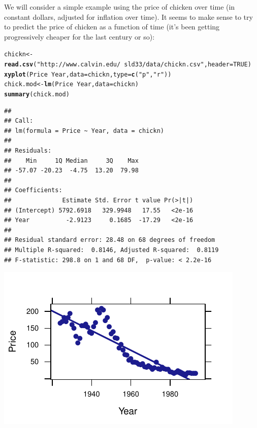 \documentclass[twoside]{book}\usepackage[]{graphicx}\usepackage[]{xcolor}
\makeatletter
\def\maxwidth{ %
  \ifdim\Gin@nat@width>\linewidth
    \linewidth
  \else
    \Gin@nat@width
  \fi
}
\newcommand{\hlnum}[1]{\textcolor[rgb]{0.686,0.059,0.569}{#1}}%
\newcommand{\hlstr}[1]{\textcolor[rgb]{0.192,0.494,0.8}{#1}}%
\newcommand{\hlopt}[1]{\textcolor[rgb]{0,0,0}{#1}}%
\newcommand{\hlstd}[1]{\textcolor[rgb]{0.345,0.345,0.345}{#1}}%
\newcommand{\hlkwb}[1]{\textcolor[rgb]{0.69,0.353,0.396}{#1}}%
\newcommand{\hlkwc}[1]{\textcolor[rgb]{0.333,0.667,0.333}{#1}}%
\newcommand{\hlkwd}[1]{\textcolor[rgb]{0.737,0.353,0.396}{\textbf{#1}}}%
\newenvironment{kframe}{%
 \def\at@end@of@kframe{}%
 \ifinner\ifhmode%
  \def\at@end@of@kframe{\end{minipage}}%
  \begin{minipage}{\columnwidth}%
 \fi\fi%
 \def\FrameCommand##1{\hskip\@totalleftmargin \hskip-\fboxsep
 \colorbox{shadecolor}{##1}\hskip-\fboxsep
     \hskip-\linewidth \hskip-\@totalleftmargin \hskip\columnwidth}%
 \MakeFramed {\advance\hsize-\width
   \@totalleftmargin\z@ \linewidth\hsize
   \@setminipage}}%
 {\par\unskip\endMakeFramed%
 \at@end@of@kframe}
\newenvironment{knitrout}{}{} %
\newcounter{example}[section]
\makeatother
\begin{document}
We will consider a simple example using the price of chicken over time (in constant dollars, adjusted for inflation over time).  It seems to make sense to try to predict the price of chicken as a function of time (it's been getting progressively cheaper for the last century or so):
\begin{knitrout}
\color{fgcolor}\begin{kframe}
\begin{alltt}
\hlstd{chickn} \hlkwb{<-} \hlkwd{read.csv}\hlstd{(}\hlstr{"http://www.calvin.edu/~sld33/data/chickn.csv"}\hlstd{,} \hlkwc{header}\hlstd{=}\hlnum{TRUE}\hlstd{)}
\hlkwd{xyplot}\hlstd{(Price}\hlopt{~}\hlstd{Year,} \hlkwc{data}\hlstd{=chickn,} \hlkwc{type}\hlstd{=}\hlkwd{c}\hlstd{(}\hlstr{"p"}\hlstd{,} \hlstr{"r"}\hlstd{))}
\hlstd{chick.mod} \hlkwb{<-} \hlkwd{lm}\hlstd{(Price}\hlopt{~}\hlstd{Year,} \hlkwc{data}\hlstd{=chickn)}
\hlkwd{summary}\hlstd{(chick.mod)}
\end{alltt}
\begin{verbatim}
## 
## Call:
## lm(formula = Price ~ Year, data = chickn)
## 
## Residuals:
##    Min     1Q Median     3Q    Max 
## -57.07 -20.23  -4.75  13.20  79.98 
## 
## Coefficients:
##              Estimate Std. Error t value Pr(>|t|)
## (Intercept) 5792.6918   329.9948   17.55   <2e-16
## Year          -2.9123     0.1685  -17.29   <2e-16
## 
## Residual standard error: 28.48 on 68 degrees of freedom
## Multiple R-squared:  0.8146,	Adjusted R-squared:  0.8119 
## F-statistic: 298.8 on 1 and 68 DF,  p-value: < 2.2e-16
\end{verbatim}
\end{kframe}

{\centering \includegraphics[width=\maxwidth]{figures/fig-chickn-1} 

}



\end{knitrout}
\end{document}
